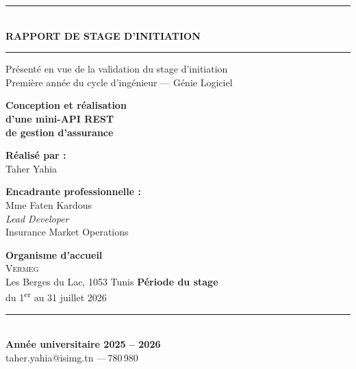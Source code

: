 \documentclass[a4paper,12pt]{article}
\begin{document}
\begin{titlepage}
\begin{center}
\vspace{10pt}
\rule{\linewidth}{0.5pt}\\[4pt]
{\large\bfseries RAPPORT DE STAGE D'INITIATION}\\[4pt]
\rule{\linewidth}{0.5pt}
\vspace{6pt}
{\small Présenté en vue de la validation du stage d'initiation}\\[2pt]
{\small Première année du cycle d'ingénieur --- Génie Logiciel}
\vspace{20pt}
{\LARGE\bfseries Conception et réalisation\\[6pt] d'une mini-API REST\\[6pt] de gestion d'assurance\par}
\vspace{24pt}
\begin{minipage}{0.44\textwidth}
\begin{flushleft}
{\small\bfseries Réalisé par :}\\[3pt]
{\small Taher Yahia}
\end{flushleft}
\end{minipage}
\hfill
\begin{minipage}{0.50\textwidth}
\begin{flushright}
{\small\bfseries Encadrante professionnelle :}\\[3pt]
{\small Mme Faten Kardous}\\
{\footnotesize\itshape Lead Developer}\\
{\footnotesize Insurance Market Operations}
\end{flushright}
\end{minipage}
\vspace{24pt}
{\small\bfseries Organisme d'accueil}\\[3pt]
{\small \textsc{Vermeg}}\\[2pt]
{\footnotesize Les Berges du Lac, 1053 Tunis}
\vspace{12pt}
{\small\bfseries Période du stage}\\[3pt]
{\small du 1\textsuperscript{er} au 31 juillet 2026}
\vfill
\rule{0.55\linewidth}{0.4pt}\\[5pt]
{\small\bfseries Année universitaire 2025 -- 2026}\\[8pt]
{\footnotesize taher.yahia@isimg.tn \quad---\,780\,980}
\end{center}
\end{titlepage}

\setcounter{page}{1}
\end{document}
